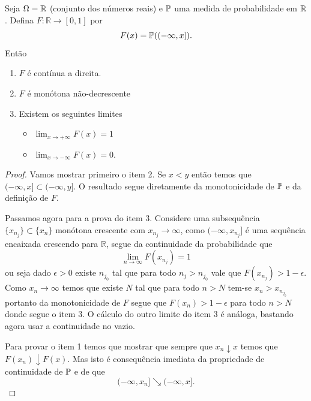 \begin{exemplo}
Seja $\Omega=\R$ (conjunto dos números reais) e $\P$ uma medida de probabilidade em $\R$.
Defina $F:\mathbb{R}\to [0,1]$ por 
	\[
		F(x) =\P((-\infty,x]).
	\]
Então 
\begin{enumerate}
	\item	
	$F$ é contínua a direita.
	
	\item
	$F$ é monótona não-decrescente	
		
	\item 
	Existem os seguintes limites 
		\begin{itemize}
			\item 
 			$\displaystyle\lim_{x\to+\infty} F(x)=1$		
			
			\item
			$\displaystyle\lim_{x\to -\infty} F(x)=0$.
		\end{itemize}
\end{enumerate}
\end{exemplo}
\begin{proof}
	Vamos mostrar primeiro o item 2. Se $x<y$ então temos que 
	$(-\infty,x]\subset (-\infty,y]$. O resultado segue diretamente 
	da monotonicidade de $\P$ e da definição de $F$.
	
	Passamos agora para a prova do item 3.  Considere uma subsequência
	 $\{x_{n_j}\}\subset \{x_n\}$ monótona 	crescente  com
	  $x_{n_{j}}\to \infty$,  como $(-\infty, x_{n_j}]$ é uma sequência 
	  encaixada crescendo  para $\mathbb{R}$, segue da continuidade da probabilidade 
	  que    
	  \[
	  \lim_{n\to \infty} F(x_{n_j})=1
	  \]
ou seja  dado  $\epsilon>0$ existe $n_{j_0}$ tal que para todo $n_j>n_{j_0}$ 
vale que $F(x_{n_j})>1-\epsilon$. Como $x_n\to \infty$ temos que 
existe $N$ tal que para todo $n>N$ tem-se $x_n> x_{n_{j_0}}$
 portanto da monotonicidade de $F$ segue que $F(x_n)>1-\epsilon$
  para todo $n>N$ donde segue o item 3.	
	 O cálculo do outro limite 
do item 3 é análoga, bastando agora usar a continuidade no 
vazio. 

Para provar o item 1 temos que mostrar que sempre que 
$x_n \downarrow x$ temos que $F(x_n) \downarrow F(x)$.
Mas isto é consequência imediata da propriedade de continuidade
de $\P$ e de que 
	\[
		(-\infty,x_n] \searrow (-\infty,x].
	\]
\end{proof}







